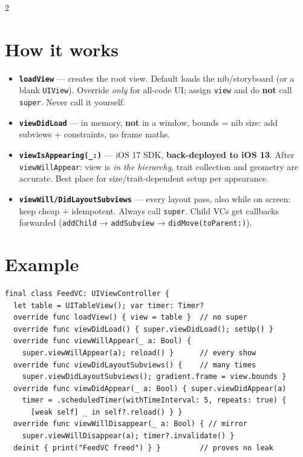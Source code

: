 \documentclass[8pt]{extarticle}
\begin{document}
\begin{multicols}{2}
\raggedright

\section{How it works}
\begin{itemize}
  \item \textbf{\texttt{loadView}} — creates the root view. Default loads the nib/storyboard
        (or a blank \texttt{UIView}). Override \emph{only} for all-code UI; assign
        \texttt{view} and do \textbf{not} call \texttt{super}. Never call it yourself.
  \item \textbf{\texttt{viewDidLoad}} — in memory, \textbf{not} in a window, bounds = nib
        size: add subviews + constraints, no frame maths.
  \item \textbf{\texttt{viewIsAppearing(\_:)}} — iOS 17 SDK, \textbf{back-deployed to iOS 13}.
        After \texttt{viewWillAppear}: view is \emph{in the hierarchy}, trait collection and
        geometry are accurate. Best place for size/trait-dependent setup per appearance.
  \item \textbf{\texttt{viewWill/DidLayoutSubviews}} — every layout pass, also while on
        screen: keep cheap + idempotent. Always call \texttt{super}. Child VCs get callbacks
        forwarded (\texttt{addChild} → \texttt{addSubview} → \texttt{didMove(toParent:)}).
\end{itemize}

\section{Example}
\begin{lstlisting}[language=SwiftSheet]
final class FeedVC: UIViewController {
  let table = UITableView(); var timer: Timer?
  override func loadView() { view = table }  // no super
  override func viewDidLoad() { super.viewDidLoad(); setUp() }
  override func viewWillAppear(_ a: Bool) {
    super.viewWillAppear(a); reload() }      // every show
  override func viewDidLayoutSubviews() {    // many times
    super.viewDidLayoutSubviews(); gradient.frame = view.bounds }
  override func viewDidAppear(_ a: Bool) { super.viewDidAppear(a)
    timer = .scheduledTimer(withTimeInterval: 5, repeats: true) {
      [weak self] _ in self?.reload() } }
  override func viewWillDisappear(_ a: Bool) { // mirror
    super.viewWillDisappear(a); timer?.invalidate() }
  deinit { print("FeedVC freed") } }         // proves no leak
\end{lstlisting}


\end{multicols}
\end{document}
